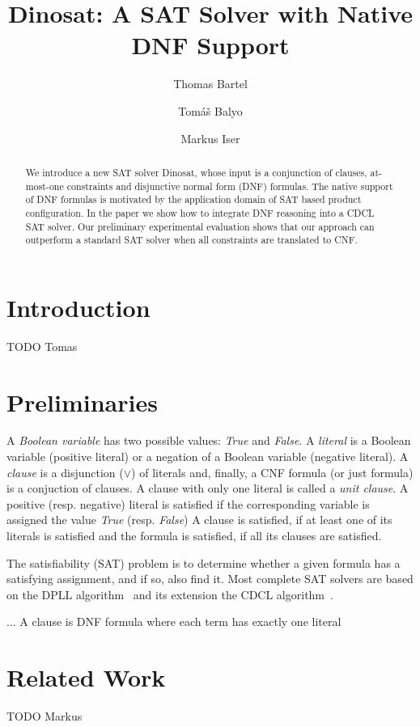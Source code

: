 \documentclass[a4paper,UKenglish,cleveref, autoref, thm-restate]{lipics-v2021}
\title{Dinosat: A SAT Solver with Native DNF Support}
\author{Thomas Bartel}{CAS Software, Karlsruhe, Germany} {thomas.bartel@cas.de}{}{}
\author{Tom\'a\v{s} Balyo}{CAS Software, Karlsruhe, Germany} {tomas.balyo@cas.de}{}{}
\author{Markus Iser}{Karlsruhe Institute of Technology, Karlsruhe, Germany} {markus.iser@kit.de}{}{}
\begin{document}
\maketitle

\begin{abstract}
We introduce a new SAT solver Dinosat, whose input is a conjunction of clauses, at-most-one constraints and disjunctive normal form (DNF) formulas. The native support of DNF formulas is motivated by the application domain of SAT based product configuration. In the paper we show how to integrate DNF reasoning into a CDCL SAT solver. Our preliminary experimental evaluation shows that our approach can outperform a standard SAT solver when all constraints are translated to CNF.
\end{abstract}

\section{Introduction}
TODO Tomas

\section{Preliminaries}
A \emph{Boolean variable} has two possible values: \emph{True} and \emph{False}. A \emph{literal} is a Boolean variable (positive literal) or a negation of a Boolean variable (negative literal). A \textit{clause} is a disjunction ($\lor$) of literals and, finally, a CNF formula (or just formula) is a conjuction of clauses.
A clause with only one literal is called a \textit{unit clause}.
A positive (resp. negative) literal is satisfied if the corresponding variable is assigned the value \textit{True} (resp. \textit{False})
A clause is satisfied, if at least one of its literals is satisfied and the formula is satisfied, if all its clauses are satisfied. 

The satisfiability (SAT) problem is to determine whether a given formula has a satisfying assignment, and if so, also find it. Most complete SAT solvers are based on the DPLL algorithm~\cite{Davis.1962} and its extension the CDCL algorithm~\cite{MarquesSilva.1999,Moskewicz.2001}. 

... A clause is DNF formula where each term has exactly one literal

\section{Related Work}
TODO Markus
\end{document}

